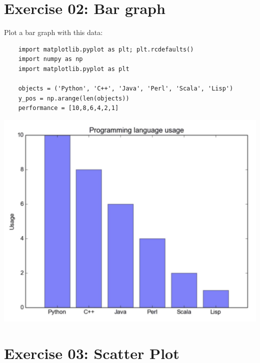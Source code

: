 \documentclass{42-en}
\begin{document}
\nextexercice
\newpage




\chapter{Exercise 02: Bar graph}

\makeheaderfiles

Plot a bar graph with this data:\\

\begin{lstlisting}
    import matplotlib.pyplot as plt; plt.rcdefaults()
    import numpy as np
    import matplotlib.pyplot as plt
    
    objects = ('Python', 'C++', 'Java', 'Perl', 'Scala', 'Lisp')
    y_pos = np.arange(len(objects))
    performance = [10,8,6,4,2,1]
\end{lstlisting}

\centerline{\includegraphics[width=150mm]{images/bar.png}}

\nextexercice
\newpage



\chapter{Exercise 03:  Scatter Plot}
\makeheaderfiles
\end{document}
